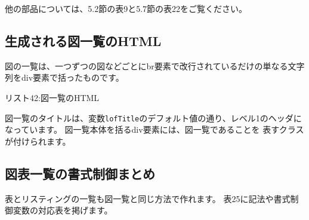 他の部品については、5.2節の表9と5.7節の表22をご覧ください。

\subsection{生成される図一覧のHTML}\label{ux751fux6210ux3055ux308cux308bux56f3ux4e00ux89a7ux306ehtml}

図の一覧は、一つずつの図などごとにbr要素で改行されているだけの単なる文字列をdiv要素で括ったものです。

リスト42:図一覧のHTML

\begin{Shaded}
\begin{Highlighting}[]
\DataTypeTok{\textless{}}\DataTypeTok{\textgreater{}}\DataTypeTok{\textless{}/}\DataTypeTok{\textgreater{}}
\DataTypeTok{\textless{}}\OperatorTok{=}\DataTypeTok{\textgreater{}}
\DataTypeTok{\textless{}}\DataTypeTok{\textgreater{}}

\DataTypeTok{\textless{}}\DataTypeTok{\textgreater{}}

\DataTypeTok{\textless{}}\DataTypeTok{\textgreater{}}

\DataTypeTok{\textless{}}\DataTypeTok{\textgreater{}}

\DataTypeTok{\textless{}}\DataTypeTok{\textgreater{}}

\DataTypeTok{\textless{}/}\DataTypeTok{\textgreater{}}
\end{Highlighting}
\end{Shaded}

図一覧のタイトルは、変数\texttt{lofTitle}のデフォルト値の通り、レベル1のヘッダになっています。
図一覧本体を括るdiv要素には、図一覧であることを
表すクラスが付けられます。

\subsection{図表一覧の書式制御まとめ}\label{ux56f3ux8868ux4e00ux89a7ux306eux66f8ux5f0fux5236ux5fa1ux307eux3068ux3081}

表とリスティングの一覧も図一覧と同じ方法で作れます。
表25に記法や書式制御変数の対応表を掲げます。

